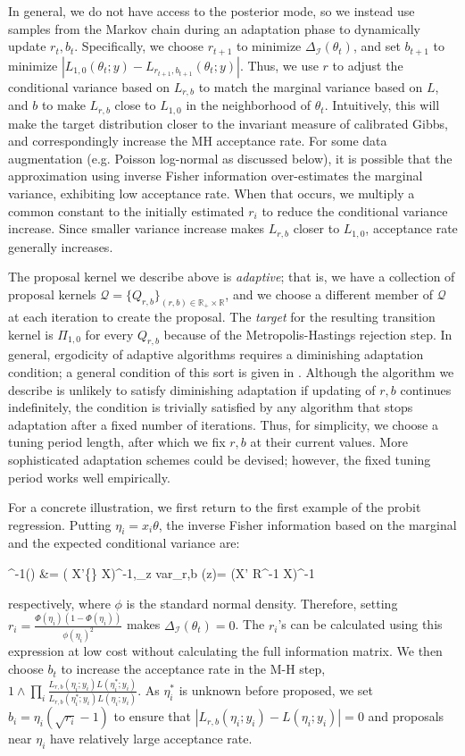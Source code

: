 \documentclass[10pt]{article}
\newcommand{\be}{\begin{equs}}
\newcommand{\ee}{\end{equs}}
\newcommand{\bb}[1]{\mathbb{#1}}
\newcommand{\mc}[1]{\mathcal{#1}}
\DeclareMathOperator{\diag}{diag}
\begin{document}
In general, we do not have access to the posterior mode, so we instead use samples from the Markov chain during an adaptation phase to dynamically update $r_t,b_t$. Specifically, we choose $r_{t+1}$ to minimize $\Delta_{\mc I}(\theta_t)$, and set $b_{t+1}$ to minimize $|L_{1,0}(\theta_t;y)- L_{r_{t+1},b_{t+1}}(\theta_t;y)|$. Thus, we use $r$ to adjust the conditional variance based on $L_{r,b}$ to match the marginal variance based on $L$, and $b$ to make $L_{r,b}$ close to $L_{1,0}$ in the neighborhood of $\theta_t$. Intuitively, this will make the target distribution closer to the invariant measure of calibrated Gibbs, and correspondingly increase the MH acceptance rate. For some data augmentation (e.g. Poisson log-normal as discussed below), it is possible that the approximation using inverse Fisher information over-estimates the marginal variance,  exhibiting low acceptance rate. When that occurs, we multiply a common constant to the initially estimated $r_i$ to reduce the conditional variance increase. Since smaller variance increase makes $L_{r,b}$ closer to $L_{1,0}$, acceptance rate generally increases.


The proposal kernel we describe above is \emph{adaptive}; that is, we have a collection of proposal kernels $\mc Q = \{Q_{r,b}\}_{(r,b) \in \bb R_+ \times \bb R}$, and we choose a different member of $\mc Q$ at each iteration to create the proposal. The \emph{target} for the resulting transition kernel is $\Pi_{1,0}$ for every $Q_{r,b}$ because of the Metropolis-Hastings rejection step.  In general, ergodicity of adaptive algorithms requires a diminishing adaptation condition; a general condition of this sort is given in \cite{roberts2007coupling}. Although the algorithm we describe is unlikely to satisfy diminishing adaptation if updating of $r,b$ continues indefinitely, the condition is trivially satisfied by any algorithm that stops adaptation after a fixed number of iterations. Thus, for simplicity, we choose a tuning period length, after which we fix $r,b$ at their current values. More sophisticated adaptation schemes could be devised; however, the fixed tuning period works well empirically.


For a concrete illustration, we first return to the first example of the probit regression. Putting $\eta_i = x_i\theta$, the inverse Fisher information based on the marginal and the expected conditional variance are:
\be
\mc I^{-1}(\theta) &= ( X'\diag\bigg\{\bigg\} X)^{-1},\qquad \bb E_z \mbox{var}_{r,b} (\theta \mid z)= (X' R^{-1} X)^{-1}
\ee
respectively, where $\phi$ is the standard normal density. Therefore, setting $r_i = \frac{\Phi(\eta_i)(1- \Phi(\eta_i))} {\phi(\eta_i)^2}$ makes $\Delta_{\mc I}(\theta_t)=0$.  The $r_i$'s can be calculated using this expression at low cost without calculating the full information matrix. We then choose $b_t$ to increase the acceptance rate in the M-H step, $1\wedge \prod_i \frac{   L_{r,b}(\eta_i;y_i) L(\eta_i^*;y_i)}{ L_{r,b}(\eta_i^*;y_i)L(\eta_i;y_i) }$. As $\eta_i^*$ is unknown before proposed, we set $b_i = \eta_i (\sqrt{r_i}-1)$ to ensure that $|L_{r,b}(\eta_i;y_i) - L(\eta_i;y_i)|=0$ and proposals near $\eta_i$ have relatively large acceptance rate.
\end{document}
